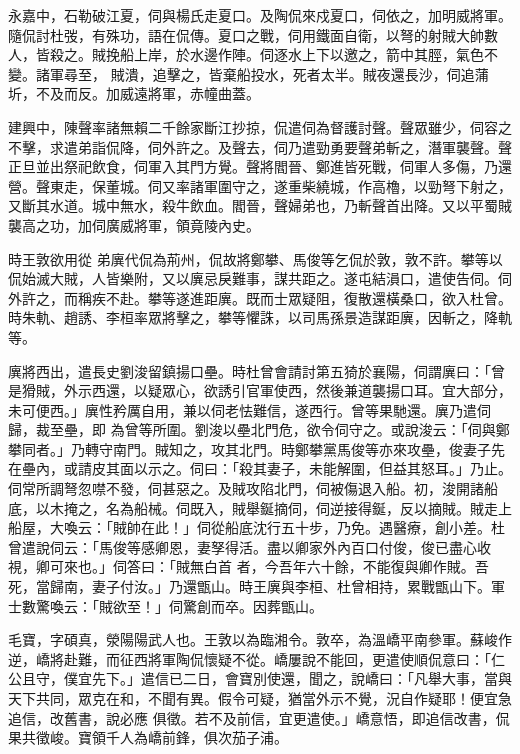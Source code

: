 \begin{pinyinscope}
 永嘉中，石勒破江夏，伺與楊氏走夏口。及陶侃來戍夏口，伺依之，加明威將軍。隨侃討杜弢，有殊功，語在侃傳。夏口之戰，伺用鐵面自衛，以弩的射賊大帥數人，皆殺之。賊挽船上岸，於水邊作陣。伺逐水上下以邀之，箭中其脛，氣色不變。諸軍尋至，
 賊潰，追擊之，皆棄船投水，死者太半。賊夜還長沙，伺追蒲圻，不及而反。加威遠將軍，赤幢曲蓋。



 建興中，陳聲率諸無賴二千餘家斷江抄掠，侃遣伺為督護討聲。聲眾雖少，伺容之不擊，求遣弟詣侃降，伺外許之。及聲去，伺乃遣勁勇要聲弟斬之，潛軍襲聲。聲正旦並出祭祀飲食，伺軍入其門方覺。聲將閻晉、鄭進皆死戰，伺軍人多傷，乃還營。聲東走，保董城。伺又率諸軍圍守之，遂重柴繞城，作高櫓，以勁弩下射之，又斷其水道。城中無水，殺牛飲血。閻晉，聲婦弟也，乃斬聲首出降。又以平蜀賊襲高之功，加伺廣威將軍，領竟陵內史。



 時王敦欲用從
 弟廙代侃為荊州，侃故將鄭攀、馬俊等乞侃於敦，敦不許。攀等以侃始滅大賊，人皆樂附，又以廙忌戾難事，謀共距之。遂屯結溳口，遣使告伺。伺外許之，而稱疾不赴。攀等遂進距廙。既而士眾疑阻，復散還橫桑口，欲入杜曾。時朱軌、趙誘、李桓率眾將擊之，攀等懼誅，以司馬孫景造謀距廙，因斬之，降軌等。



 廙將西出，遣長史劉浚留鎮揚口壘。時杜曾會請討第五猗於襄陽，伺謂廙曰：「曾是猾賊，外示西還，以疑眾心，欲誘引官軍使西，然後兼道襲揚口耳。宜大部分，未可便西。」廙性矜厲自用，兼以伺老怯難信，遂西行。曾等果馳還。廙乃遣伺歸，裁至壘，即
 為曾等所圍。劉浚以壘北門危，欲令伺守之。或說浚云：「伺與鄭攀同者。」乃轉守南門。賊知之，攻其北門。時鄭攀黨馬俊等亦來攻壘，俊妻子先在壘內，或請皮其面以示之。伺曰：「殺其妻子，未能解圍，但益其怒耳。」乃止。伺常所調弩忽噤不發，伺甚惡之。及賊攻陷北門，伺被傷退入船。初，浚開諸船底，以木掩之，名為船械。伺既入，賊舉鋋摘伺，伺逆接得鋋，反以摘賊。賊走上船屋，大喚云：「賊帥在此！」伺從船底沈行五十步，乃免。遇醫療，創小差。杜曾遣說伺云：「馬俊等感卿恩，妻孥得活。盡以卿家外內百口付俊，俊已盡心收視，卿可來也。」伺答曰：「賊無白首
 者，今吾年六十餘，不能復與卿作賊。吾死，當歸南，妻子付汝。」乃還甑山。時王廙與李桓、杜曾相持，累戰甑山下。軍士數驚喚云：「賊欲至！」伺驚創而卒。因葬甑山。



 毛寶，字碩真，滎陽陽武人也。王敦以為臨湘令。敦卒，為溫嶠平南參軍。蘇峻作逆，嶠將赴難，而征西將軍陶侃懷疑不從。嶠屢說不能回，更遣使順侃意曰：「仁公且守，僕宜先下。」遣信已二日，會寶別使還，聞之，說嶠曰：「凡舉大事，當與天下共同，眾克在和，不聞有異。假令可疑，猶當外示不覺，況自作疑耶！便宜急追信，改舊書，說必應
 俱徵。若不及前信，宜更遣使。」嶠意悟，即追信改書，侃果共徵峻。寶領千人為嶠前鋒，俱次茄子浦。




\end{pinyinscope}
